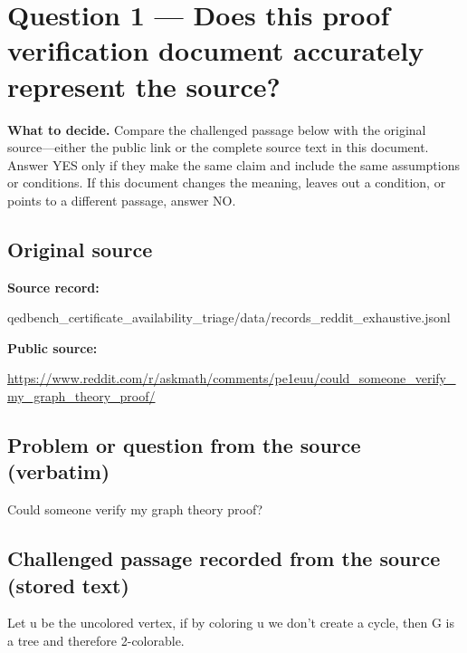\documentclass[11pt]{article}
\begin{document}
\section*{Question 1 --- Does this proof verification document accurately represent the source?}
\textbf{What to decide.} Compare the challenged passage below with the original source---either the public link or the complete source text in this document. Answer YES only if they make the same claim and include the same assumptions or conditions. If this document changes the meaning, leaves out a condition, or points to a different passage, answer NO.
\subsection*{Original source}
\textbf{Source record:}
\begin{Vsrc}
qedbench_certificate_availability_triage/data/records_reddit_exhaustive.jsonl
\end{Vsrc}
\textbf{Public source:}\par
\url{https://www.reddit.com/r/askmath/comments/pe1euu/could_someone_verify_my_graph_theory_proof/}\par
\subsection*{Problem or question from the source (verbatim)}
\begin{Vsrc}
Could someone verify my graph theory proof?
\end{Vsrc}
\subsection*{Challenged passage recorded from the source (stored text)}
\begin{Vsrc}
Let u be the uncolored vertex, if by coloring u we don't create a cycle, then G is a tree and therefore 2-colorable.
\end{Vsrc}
\end{document}
